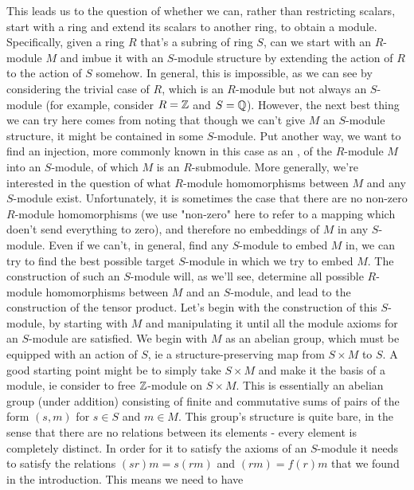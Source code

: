 \documentclass{article}
\begin{document}
This leads us to the question of whether we can, rather than restricting scalars, start with a ring and extend its scalars to another ring, to obtain a module. Specifically, given a ring $ R $ that's a subring of ring $ S $, can we start with an $ R $-module $ M $ and imbue it with an $ S $-module structure by extending the action of $ R $ to the action of $ S $ somehow. In general, this is impossible, as we can see by considering the trivial case of $ R $, which is an $ R $-module but not always an $ S $-module (for example, consider $ R = \mathbb{Z} $ and $ S = \mathbb{Q} $). However, the next best thing we can try here comes from noting that though we can't give $ M $ an $ S $-module structure, it might be contained in some $ S $-module. Put another way, we want to find an injection, more commonly known in this case as an , of the $ R $-module $ M $ into an $ S $-module, of which $ M $ is an $ R $-submodule. More generally, we're interested in the question of what $ R $-module homomorphisms between $ M $ and any $ S $-module exist. Unfortunately, it is sometimes the case that there are no non-zero $ R $-module homomorphisms (we use "non-zero" here to refer to a mapping which doen't send everything to zero), and therefore no embeddings of $ M $ in any $ S $-module.
\nn
Even if we can't, in general, find any $ S $-module to embed $ M $ in, we can try to find the best possible target $ S $-module in which we try to embed $ M $. The construction of such an $ S $-module will, as we'll see, determine all possible $ R $-module homomorphisms between $ M $ and an $ S $-module, and lead to the construction of the tensor product. Let's begin with the construction of this $ S $-module, by starting with $ M $ and manipulating it until all the module axioms for an $ S $-module are satisfied. We begin with $ M $ as an abelian group, which must be equipped with an action of $ S $, ie a structure-preserving map from $ S \times M $ to $ S $. A good starting point might be to simply take $ S \times M $ and make it the basis of a module, ie consider to free $ \mathbb{Z} $-module on $ S \times M $. This is essentially an abelian group (under addition) consisting of finite and commutative sums of pairs of the form $ (s, m) $ for $ s \in S $ and $ m \in M $. This group's structure is quite bare, in the sense that there are no relations between its elements - every element is completely distinct. In order for it to satisfy the axioms of an $ S $-module it needs to satisfy the relations $ (s r) m = s (r m) $ and $ (r m) = f(r) m $ that we found in the introduction. This means we need to have
\end{document}
